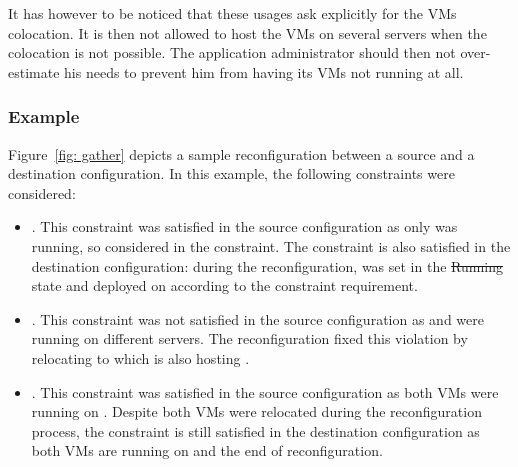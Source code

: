 It has however to be noticed that these usages ask explicitly for the VMs colocation. It is then not allowed to host the VMs on several servers when the colocation is not possible. The application administrator should then  not over-estimate his needs to prevent him from having its VMs not running at all.

\subsubsection{Example}

Figure~\ref{fig: gather} depicts a sample reconfiguration between a source and a destination configuration. In this example, the following  constraints were considered:

\begin{itemize}

\item {}. This constraint was satisfied in the source configuration as only 
was running, so considered in the constraint. The constraint is also satisfied in the destination configuration:
during the reconfiguration,  was set in the \st{Running} state and deployed on  according to
the constraint requirement.

\item {}. This constraint was not satisfied in the source configuration as  and  were running on different servers. The reconfiguration fixed this violation by relocating  to  which is also hosting .

\item {}. This constraint was satisfied in the source configuration as both VMs were running on . Despite both VMs were relocated during the reconfiguration process, the constraint is still satisfied in the destination configuration as both VMs are running on  and the end of reconfiguration.
\end{itemize}

